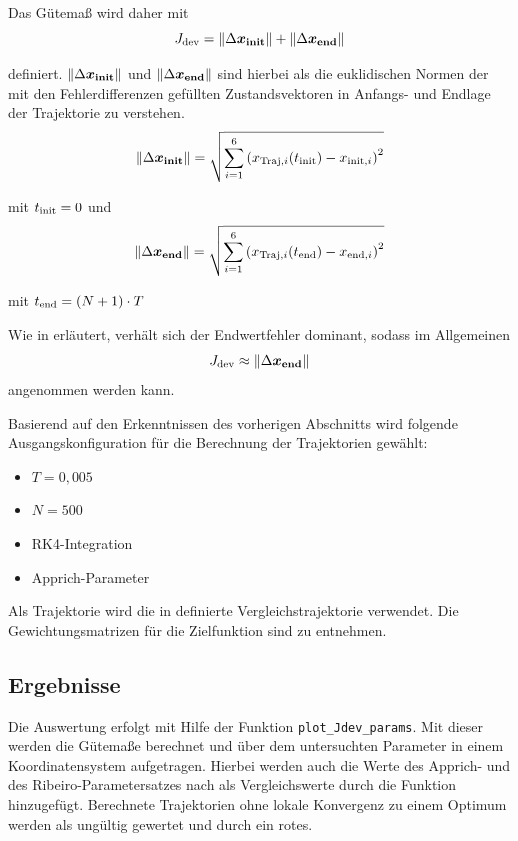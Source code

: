 Das Gütemaß wird daher mit
	\[
	J_{\mathrm{dev}} = \left\| \Delta \boldsymbol{x_{\mathrm{init}}} \right\| + \left\| \Delta \boldsymbol{x_{\mathrm{end}}} \right\|
	\]
	
definiert. $\left\|\Delta \boldsymbol{x_{\mathrm{init}}}\right\|$ und $\left\|\Delta \boldsymbol{x_{\mathrm{end}}}\right\|$ sind hierbei als die euklidischen Normen der mit den Fehlerdifferenzen gefüllten Zustandsvektoren in Anfangs- und Endlage der Trajektorie zu verstehen.
\[
	\left\| \Delta \boldsymbol{x_{\mathrm{init}}} \right\| = \sqrt{ \sum_{i=1}^6 \left( x_{\mathrm{Traj,}i}(t_{\mathrm{init}}) - x_{\mathrm{init,}i} \right)^2 }
\]

mit $t_{\mathrm{init}} = 0$ und
	\[
	\left\| \Delta \boldsymbol{x_{\mathrm{end}}} \right\| = \sqrt{ \sum_{i=1}^6 \left( x_{\mathrm{Traj,}i}(t_{\mathrm{end}}) - x_{\mathrm{end,}i} \right)^2 }
\]

mit $t_{\mathrm{end}} = (N+1) \cdot T$

Wie in  erläutert, verhält sich der Endwertfehler dominant, sodass im Allgemeinen
\[
	J_{\mathrm{dev}} \approx \left\| \Delta \boldsymbol{x_{\mathrm{end}}} \right\|
	\]	 
angenommen werden kann.



Basierend auf den Erkenntnissen des vorherigen Abschnitts wird folgende Ausgangskonfiguration für die Berechnung der Trajektorien gewählt:
\begin{itemize}
	\item $T = 0,005$
	\item $N = 500$
	\item RK4-Integration
	\item Apprich-Parameter
\end{itemize}

Als Trajektorie wird die in  definierte Vergleichstrajektorie verwendet. Die Gewichtungsmatrizen für die Zielfunktion sind  zu entnehmen.


\subsection{Ergebnisse}\label{subsec:trjParTestRes}

Die Auswertung erfolgt mit Hilfe der Funktion \texttt{plot\_Jdev\_params}. Mit dieser werden die Gütemaße berechnet und über dem untersuchten Parameter in einem Koordinatensystem aufgetragen. Hierbei werden auch die Werte des Apprich- und des Ribeiro-Parametersatzes nach  als Vergleichswerte durch die Funktion hinzugefügt. Berechnete Trajektorien ohne lokale Konvergenz zu einem Optimum werden als ungültig gewertet und durch ein rotes.


